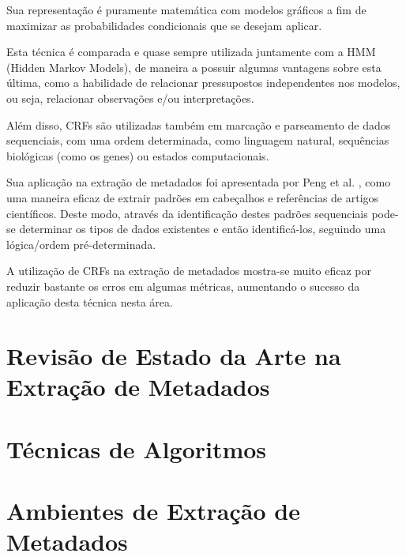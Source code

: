 Sua representação é puramente matemática com modelos gráficos a fim de maximizar as probabilidades condicionais que se desejam aplicar.

Esta técnica é comparada e quase sempre utilizada juntamente com a HMM (Hidden Markov Models), de maneira a possuir algumas vantagens sobre esta última, como a habilidade de relacionar pressupostos independentes nos modelos, ou seja, relacionar observações e/ou interpretações.

Além disso, CRFs são utilizadas também em marcação e parseamento de dados sequenciais, com uma ordem determinada, como linguagem natural, sequências biológicas (como os genes) ou estados computacionais.


Sua aplicação na extração de metadados foi apresentada por Peng et al. \cite{crf-ie}, como uma maneira eficaz de extrair padrões em cabeçalhos e referências de artigos científicos. Deste modo, através da identificação destes padrões sequenciais pode-se determinar os tipos de dados existentes e então identificá-los, seguindo uma lógica/ordem pré-determinada.

A utilização de CRFs na extração de metadados mostra-se muito eficaz por reduzir bastante os erros em algumas métricas, aumentando o sucesso da aplicação desta técnica nesta área.













\section{Revisão de Estado da Arte na Extração de Metadados}

\section{Técnicas de Algoritmos}

\section{Ambientes de Extração de Metadados}















